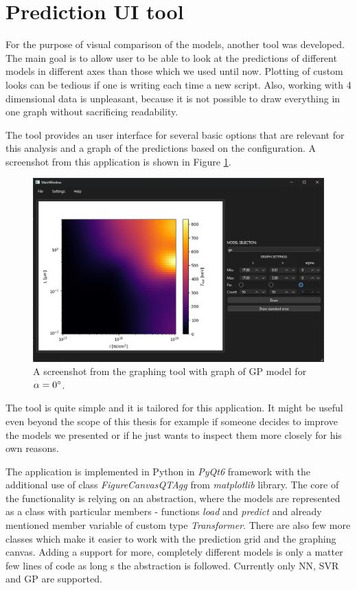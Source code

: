 \newpage

\section{Prediction UI tool}
For the purpose of visual comparison of the models, another tool was developed. The main goal is to allow user to be able to look at the predictions of different models in different axes than those which we used until now. Plotting of custom looks can be tedious if one is writing each time a new script. Also, working with 4 dimensional data is unpleasant, because it is not possible to draw everything in one graph without sacrificing readability.

The tool provides an user interface for several basic options that are relevant for this analysis and a graph of the predictions based on the configuration. A screenshot from this application is shown in Figure \ref{fig:graph-tool}.

\begin{figure}[h]
	\centering
	\includegraphics[width=0.85 \textwidth]{figures/graph_tool}
	\caption{A screenshot from the graphing tool with graph of GP model for $\alpha = 0\degree$.}
	\label{fig:graph-tool}
\end{figure}

The tool is quite simple and it is tailored for this application. It might be useful even beyond the scope of this thesis for example if someone decides to improve the models we presented or if he just wants to inspect them more closely for his own reasons. 

The application is implemented in Python in \textit{PyQt6} framework with the additional use of class \textit{FigureCanvasQTAgg} from \textit{matplotlib} library. The core of the functionality is relying on an abstraction, where the models are represented as a class with particular members - functions \textit{load} and \textit{predict} and already mentioned member variable of custom type \textit{Transformer}. There are also few more classes which make it easier to work with the prediction grid and the graphing canvas. Adding a support for more, completely different models is only a matter few lines of code as long s the abstraction is followed. Currently only NN, SVR and GP are supported.

